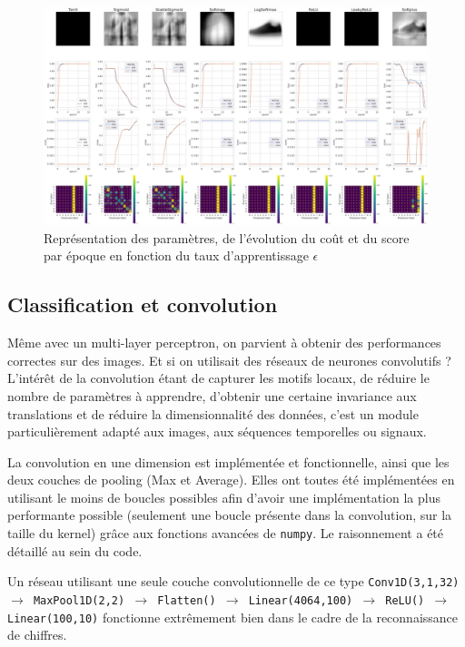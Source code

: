 \documentclass{article}
\begin{document}
\begin{figure}[htbp]
    \centering
    \includegraphics[width=\textwidth]{activation_func.pdf}
    \caption{Représentation des paramètres, de l'évolution du coût et du score par époque en fonction du taux d'apprentissage $ \epsilon $ }
    \label{fig:activationfunc}
\end{figure}

\subsection{Classification et convolution}

Même avec un multi-layer perceptron, on parvient à obtenir des performances correctes sur des images. Et si on utilisait des réseaux de neurones convolutifs ? L'intérêt de la convolution étant de capturer les motifs locaux, de réduire le nombre de paramètres à apprendre, d'obtenir une certaine invariance aux translations et de réduire la dimensionnalité des données, c'est un module particulièrement adapté aux images, aux séquences temporelles ou signaux.

La convolution en une dimension est implémentée et fonctionnelle, ainsi que les deux couches de pooling (Max et Average). Elles ont toutes été implémentées en utilisant le moins de boucles possibles afin d'avoir une implémentation la plus performante possible (seulement une boucle présente dans la convolution, sur la taille du kernel) grâce aux fonctions avancées de \texttt{numpy}. Le raisonnement a été détaillé au sein du code.

Un réseau utilisant une seule couche convolutionnelle de ce type \texttt{Conv1D(3,1,32) $\rightarrow$ MaxPool1D(2,2) $\rightarrow$ Flatten() $\rightarrow$ Linear(4064,100) $\rightarrow$ ReLU() $\rightarrow$ Linear(100,10)} fonctionne extrêmement bien dans le cadre de la reconnaissance de chiffres.
\end{document}
